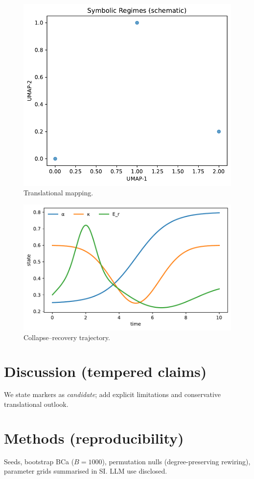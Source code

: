 \documentclass[fleqn,10pt]{wlscirep}
\begin{document}
\begin{figure}[H]\centering\includegraphics[width=\linewidth]{Fig_symbolic_regimes_map.pdf}\caption{Translational mapping.}\end{figure}
\begin{figure}[H]\centering\includegraphics[width=\linewidth]{Fig_collapse_recovery.pdf}\caption{Collapse--recovery trajectory.}\end{figure}

\section*{Discussion (tempered claims)} %
We state markers as \emph{candidate}; add explicit limitations and conservative translational outlook.

\section*{Methods (reproducibility)} %
Seeds, bootstrap BCa ($B{=}1000$), permutation nulls (degree-preserving rewiring), parameter grids summarised in SI. LLM use disclosed.


\end{document}
